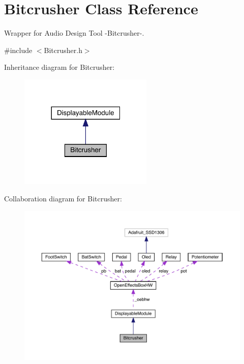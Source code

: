 \hypertarget{class_bitcrusher}{}\section{Bitcrusher Class Reference}
\label{class_bitcrusher}


Wrapper for Audio Design Tool -\/\+Bitcrusher-\/.  




{\ttfamily \#include $<$Bitcrusher.\+h$>$}



Inheritance diagram for Bitcrusher\+:
\nopagebreak
\begin{figure}[H]
\begin{center}
\leavevmode
\includegraphics[width=180pt]{class_bitcrusher__inherit__graph}
\end{center}
\end{figure}


Collaboration diagram for Bitcrusher\+:
\nopagebreak
\begin{figure}[H]
\begin{center}
\leavevmode
\includegraphics[width=350pt]{class_bitcrusher__coll__graph}
\end{center}
\end{figure}
